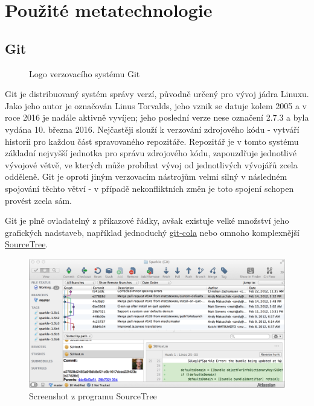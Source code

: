 \section{Použité metatechnologie}

\subsection{Git}

\begin{figure}
 \centering
 
 \caption{Logo verzovacího systému Git}
\end{figure}

Git je distribuovaný systém správy verzí, původně určený pro vývoj jádra Linuxu. Jako jeho autor je označován Linus Torvalds, jeho vznik se datuje kolem 2005 a v roce 2016 je nadále aktivně vyvíjen; jeho poslední verze nese označení 2.7.3 a byla vydána 10. března 2016. Nejčastěji slouží k verzování zdrojového kódu - vytváří historii pro každou část spravovaného repozitáře. Repozitář je v tomto systému základní nejvyšší jednotka pro správu zdrojového kódu, zapouzdřuje jednotlivé vývojové větvě, ve kterých může probíhat vývoj od jednotlivých vývojářů zcela odděleně. Git je oproti jiným verzovacím nástrojům velmi silný v následném spojování těchto větví - v případě nekonfliktních změn je toto spojení schopen provést zcela sám.

Git je plně ovladatelný z příkazové řádky, avšak existuje velké množství jeho grafických nadstaveb, například jednoduchý \href{http://git-cola.github.io/}{git-cola} nebo omnoho komplexnější \href{https://www.sourcetreeapp.com/}{SourceTree}.

\begin{figure}[H]
 \centering
 \includegraphics[width=\textwidth]{images/source-tree-screenshot}
 \caption{Screenshot z programu SourceTree}
\end{figure}

